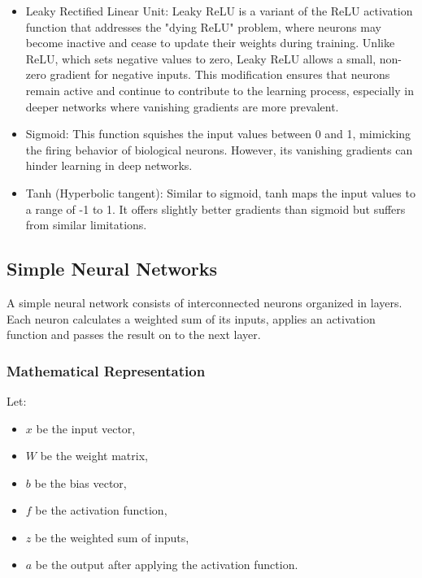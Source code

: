 \documentclass{article}
\begin{document}
\begin{itemize}
    \item[\ding{118}] Leaky Rectified Linear Unit:
          Leaky ReLU is a variant of the ReLU activation function that addresses the "dying ReLU" problem, where neurons may become inactive and cease to update their weights during training. Unlike ReLU, which sets negative values to zero, Leaky ReLU allows a small, non-zero gradient for negative inputs. This modification ensures that neurons remain active and continue to contribute to the learning process, especially in deeper networks where vanishing gradients are more prevalent.
\end{itemize}

\begin{itemize}
    \item[\ding{118}] Sigmoid:
          This function squishes the input values between 0 and 1, mimicking the firing behavior of biological neurons. However, its vanishing gradients can hinder learning in deep networks.
\end{itemize}

\begin{itemize}
    \item[\ding{118}] Tanh (Hyperbolic tangent):
          Similar to sigmoid, tanh maps the input values to a range of -1 to 1. It offers slightly better gradients than sigmoid but suffers from similar limitations.
\end{itemize}

\subsection{Simple Neural Networks}
A simple neural network consists of interconnected neurons organized in layers. Each neuron calculates a weighted sum of its inputs, applies an activation function and passes the result on to the next layer.
\subsubsection{Mathematical Representation}

Let:
\begin{itemize}
    \item \( x \) be the input vector,
    \item \( W \) be the weight matrix,
    \item \( b \) be the bias vector,
    \item \( f \) be the activation function,
    \item \( z \) be the weighted sum of inputs,
    \item \( a \) be the output after applying the activation function.
\end{itemize}
\end{document}
